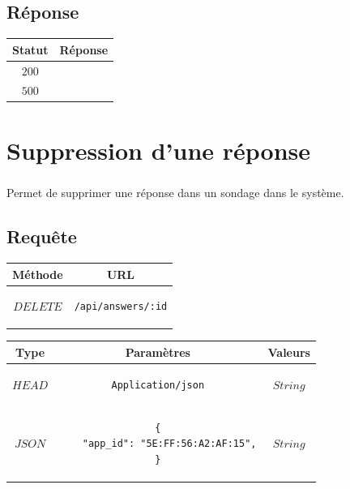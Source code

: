 \documentclass[titlepage]{report}
\begin{document}
\section{Réponse}

\begin{center}
	\begin{tabular}{|c|c|}
		\hline
		Statut & Réponse \\
		\hline
		$ 200 $ &  \\ 
		\hline
		$ 500 $ & \\
		\hline
	\end{tabular}
\end{center}


\chapter{Suppression d'une réponse}

\paragraph{} Permet de supprimer une réponse dans un sondage dans le système.

\section{Requête}

\begin{center}
	\begin{tabular}{|c|c|}
		\hline
		Méthode & URL \\
		\hline
		$ DELETE $ 
		&
		\begin{lstlisting}
/api/answers/:id
		\end{lstlisting} 
		\\ \hline
	\end{tabular}
\end{center}


\begin{center}
	\begin{tabular}{|c|c|c|}
		\hline
		Type & Paramètres & Valeurs \\
		\hline
		$ HEAD $ & 
		\begin{lstlisting}
Application/json
		\end{lstlisting} &
		$ String $ \\ 
		\hline
		$ JSON $ & 
		\begin{lstlisting}
{
	"app_id": "5E:FF:56:A2:AF:15",
}
		\end{lstlisting} &
		$ String $ \\
		\hline	
	\end{tabular}
\end{center}
\end{document}
